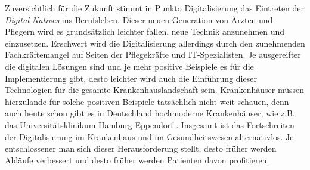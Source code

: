 Zuversichtlich für die Zukunft stimmt in Punkto Digitalisierung das Eintreten der \textit{Digital Natives} ins Berufsleben. Dieser neuen Generation von Ärzten und Pflegern wird es grundsätzlich leichter fallen, neue Technik anzunehmen und einzusetzen. Erschwert wird die Digitalisierung allerdings durch den zunehmenden Fachkräftemangel auf Seiten der Pflegekräfte und IT-Spezialisten. Je ausgereifter die digitalen Lösungen sind und je mehr positive Beispiele es für die Implementierung gibt, desto leichter wird auch die Einführung dieser Technologien für die gesamte Krankenhauslandschaft sein. Krankenhäuser müssen hierzulande für solche positiven Beispiele tatsächlich nicht weit schauen, denn auch heute schon gibt es in Deutschland hochmoderne Krankenhäuser, wie z.B. das Universitätsklinikum Hamburg-Eppendorf \parencite{Baehr2019}. Insgesamt ist das Fortschreiten der Digitalisierung im Krankenhaus und im Gesundheitswesen alternativlos. Je entschlossener man sich dieser Herausforderung stellt, desto früher werden Abläufe verbessert und desto früher werden Patienten davon profitieren.
